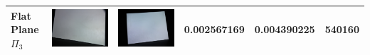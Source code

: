 \documentclass[final,12pt,3p]{elsarticle}
\begin{document}
\begin{table}[!ht]
{\begin{tabular}{| l | >{\centering\arraybackslash} m{2.5cm} | >{\centering\arraybackslash} m{2.5cm} | c | c | c |}
   Flat Plane $\Pi_{3}$ & \includegraphics[scale=0.05]{./plane3_cam1.JPG} & \includegraphics[scale=0.05]{./plane3_cam2.JPG} & 0.002567169 & 0.004390225 & 540160\\
   \hline

\end{tabular}}
\end{table}
\end{document}

